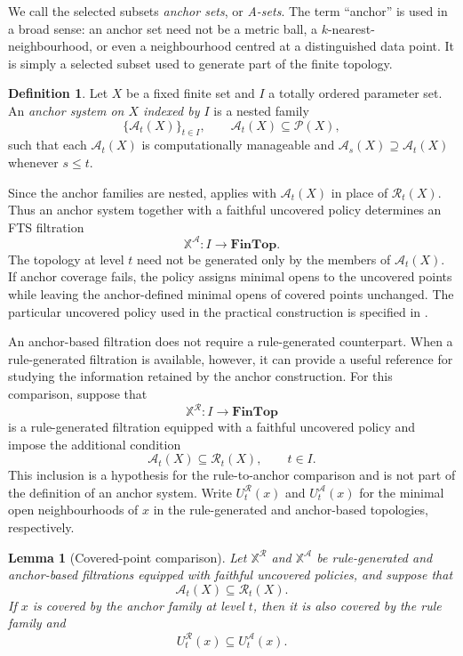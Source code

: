 \documentclass[a4paper,11pt]{article}
\newtheorem{lemma}[lemma]{Lemma}
\theoremstyle{definition}
\newtheorem{definition}[definition]{Definition}
\theoremstyle{remark}
\begin{document}
We call the selected subsets \emph{anchor sets}, or \emph{A-sets}. The term ``anchor'' is used in a broad sense: an anchor set need not be a metric ball, a $k$-nearest-neighbourhood, or even a neighbourhood centred at a distinguished data point. It is simply a selected subset used to generate part of the finite topology.

\begin{definition}
Let $X$ be a fixed finite set and $I$ a totally ordered parameter set. An \emph{anchor system on $X$ indexed by $I$} is a nested family
$$
\{\mathcal A_t(X)\}_{t\in I},\qquad \mathcal A_t(X)\subseteq\mathcal P(X),
$$
such that each $\mathcal A_t(X)$ is computationally manageable and $\mathcal A_s(X)\supseteq\mathcal A_t(X)$ whenever $s\leq t$.
\end{definition}

Since the anchor families are nested,  applies with $\mathcal A_t(X)$ in place of $\mathcal R_t(X)$. Thus an anchor system together with a faithful uncovered policy determines an FTS filtration
$$
\mathbb X^{\mathcal A}\colon I\longrightarrow\mathbf{FinTop}.
$$
The topology at level $t$ need not be generated only by the members of $\mathcal A_t(X)$. If anchor coverage fails, the policy assigns minimal opens to the uncovered points while leaving the anchor-defined minimal opens of covered points unchanged. The particular uncovered policy used in the practical construction is specified in .

An anchor-based filtration does not require a rule-generated counterpart. When a rule-generated filtration is available, however, it can provide a useful reference for studying the information retained by the anchor construction. For this comparison, suppose that
$$
\mathbb X^{\mathcal R}\colon I\longrightarrow\mathbf{FinTop}
$$
is a rule-generated filtration equipped with a faithful uncovered policy and impose the additional condition
$$
\mathcal A_t(X)\subseteq\mathcal R_t(X),\qquad t\in I.
$$
This inclusion is a hypothesis for the rule-to-anchor comparison and is not part of the definition of an anchor system. Write $U_t^{\mathcal R}(x)$ and $U_t^{\mathcal A}(x)$ for the minimal open neighbourhoods of $x$ in the rule-generated and anchor-based topologies, respectively.

\begin{lemma}[Covered-point comparison]
\label{lem:anchor-covered-comparison}
Let $\mathbb X^{\mathcal R}$ and $\mathbb X^{\mathcal A}$ be rule-generated and anchor-based filtrations equipped with faithful uncovered policies, and suppose that
$$
\mathcal A_t(X)\subseteq\mathcal R_t(X).
$$
If $x$ is covered by the anchor family at level $t$, then it is also covered by the rule family and
$$
U_t^{\mathcal R}(x)\subseteq U_t^{\mathcal A}(x).
$$
\end{lemma}
\end{document}
